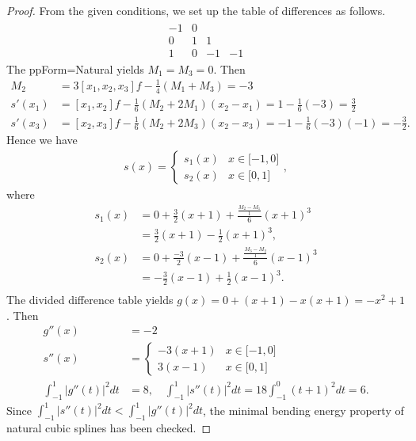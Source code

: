 \documentclass{article}
\newcommand{\RNum}[1]{\uppercase\expandafter{\romannumeral #1\relax}}
\begin{document}
\RNum{4}
\begin{proof}
  From the given conditions, we set up the table of differences as follows.
\begin{align*}
  \begin{array}{c|ccc}-1&0&&\\0&1&1&\\1&0&-1&-1\end{array}
\end{align*}
  The ppForm=Natural yields $M_1=M_3=0$. Then
\begin{align*}
  M_2 &= 3[x_1,x_2,x_3]f-\frac{1}{4}(M_1+M_3)=-3\\
  s'(x_1)&=[x_1,x_2]f-\frac{1}{6}(M_2+2M_1)(x_{2}-x_1)=1-\frac{1}{6}(-3)=\frac{3}{2}\\
  s'(x_3)&=[x_2,x_3]f-\frac{1}{6}(M_{2}+2M_3)(x_2-x_3)=-1-\frac{1}{6}(-3)(-1)=-\frac{3}{2}.
\end{align*}
Hence we have 
\begin{align*}
  s(x)=\left\{\begin{array}{lc}s_1(x)&x\in\lbrack-1,0\rbrack\\s_2(x)&x\in\lbrack0,1\rbrack\end{array}\right. ,
\end{align*}
where
\begin{align*}
  s_1(x)&=0+\frac{3}{2}(x+1)+\frac{\frac{M_2-M_1}{1}}{6}(x+1)^3\\
        &=\frac{3}{2}(x+1)-\frac{1}{2}(x+1)^3,\\
  s_2(x)&=0+\frac{-3}{2}(x-1)+\frac{\frac{M_3-M_2}{1}}{6}(x-1)^3\\
        &=-\frac{3}{2}(x-1)+\frac{1}{2}(x-1)^3.\\
\end{align*}
The divided difference table yields $g(x)=0+(x+1)-x(x+1)=-x^2+1$. Then 
\begin{align*}
g''(x)&=-2\\
s''(x)&=\left\{\begin{array}{lc}-3(x+1)&x\in\lbrack-1,0\rbrack\\3(x-1)&x\in\lbrack0,1\rbrack\end{array}\right. \\
\int_{-1}^1|g''(t)|^2dt&=8,\quad \int_{-1}^{1}|s''(t)|^2dt=18\int_{-1}^0(t+1)^2dt=6.
\end{align*}
Since $\int_{-1}^{1}|s''(t)|^2dt<\int_{-1}^{1}|g''(t)|^2dt$, the minimal bending energy property of natural cubic splines has been checked. 
\end{proof}
\end{document}
